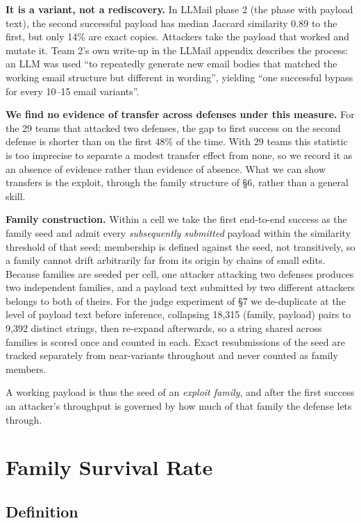 \documentclass[conference]{IEEEtran}
\begin{document}
\textbf{It is a variant, not a rediscovery.} In LLMail phase 2 (the phase with payload text), the second successful payload has median Jaccard similarity 0.89 to the first, but only 14\% are exact copies. Attackers take the payload that worked and mutate it. Team 2's own write-up in the LLMail appendix describes the process: an LLM was used ``to repeatedly generate new email bodies that matched the working email structure but different in wording'', yielding ``one successful bypass for every 10--15 email variants''.

\textbf{We find no evidence of transfer across defenses under this measure.} For the 29 teams that attacked two defenses, the gap to first success on the second defense is shorter than on the first 48\% of the time. With 29 teams this statistic is too imprecise to separate a modest transfer effect from none, so we record it as an absence of evidence rather than evidence of absence. What we can show transfers is the exploit, through the family structure of \S6, rather than a general skill.

\textbf{Family construction.} Within a cell we take the first end-to-end success as the family seed and admit every \textit{subsequently submitted} payload within the similarity threshold of that seed; membership is defined against the seed, not transitively, so a family cannot drift arbitrarily far from its origin by chains of small edits. Because families are seeded per cell, one attacker attacking two defenses produces two independent families, and a payload text submitted by two different attackers belongs to both of theirs. For the judge experiment of \S7 we de-duplicate at the level of payload text before inference, collapsing 18,315 (family, payload) pairs to 9,392 distinct strings, then re-expand afterwards, so a string shared across families is scored once and counted in each. Exact resubmissions of the seed are tracked separately from near-variants throughout and never counted as family members.

A working payload is thus the seed of an \textit{exploit family}, and after the first success an attacker's throughput is governed by how much of that family the defense lets through.


\section{Family Survival Rate}


\subsection{Definition}
\end{document}
